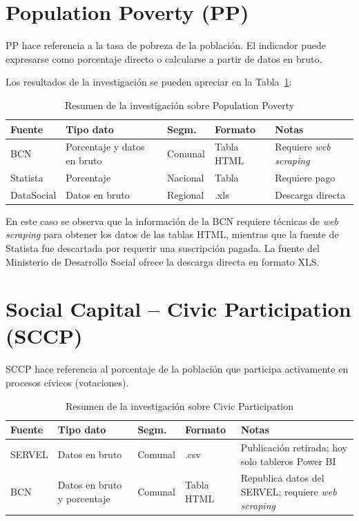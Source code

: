 \documentclass[12pt,letterpaper,oneside]{report}
\begin{document}
\section{Population Poverty (PP)}
\label{sec:pp}

PP hace referencia a la tasa de pobreza de la poblaci\'on. El indicador puede expresarse como porcentaje directo o calcularse a partir de datos en bruto.

Los resultados de la investigaci\'on se pueden apreciar en la Tabla~\ref{tab:pp}:

\begin{table}[H]
\centering
\caption{Resumen de la investigaci\'on sobre Population Poverty}
\label{tab:pp}
\begin{tabular}{|p{3cm}|p{2.5cm}|p{2cm}|p{2cm}|p{3cm}|}
\hline
\textbf{Fuente} & \textbf{Tipo dato} & \textbf{Segm.} & \textbf{Formato} & \textbf{Notas} \\
\hline
BCN \parencite{bcn-a} & Porcentaje y datos en bruto & Comunal & Tabla HTML & Requiere \textit{web scraping} \\
\hline
Statista \parencite{statista} & Porcentaje & Nacional & Tabla & Requiere pago \\
\hline
DataSocial \parencite{datasocial} & Datos en bruto & Regional & .xls & Descarga directa \\
\hline
\end{tabular}
\end{table}

En este caso se observa que la informaci\'on de la BCN requiere t\'ecnicas de \textit{web scraping} para obtener los datos de las tablas HTML, mientras que la fuente de Statista fue descartada por requerir una suscripci\'on pagada. La fuente del Ministerio de Desarrollo Social ofrece la descarga directa en formato XLS.

\section{Social Capital -- Civic Participation (SCCP)}
\label{sec:sccp}

SCCP hace referencia al porcentaje de la poblaci\'on que participa activamente en procesos c\'ivicos (votaciones).

\begin{table}[H]
\centering
\caption{Resumen de la investigaci\'on sobre Civic Participation}
\label{tab:sccp}
\begin{tabular}{|p{3cm}|p{2.5cm}|p{2cm}|p{2cm}|p{3cm}|}
\hline
\textbf{Fuente} & \textbf{Tipo dato} & \textbf{Segm.} & \textbf{Formato} & \textbf{Notas} \\
\hline
SERVEL \parencite{servel} & Datos en bruto & Comunal & .csv & Publicaci\'on retirada; hoy solo tableros Power BI \\
\hline
BCN \parencite{bcn-d} & Datos en bruto y porcentaje & Comunal & Tabla HTML & Republica datos del SERVEL; requiere \textit{web scraping} \\
\hline
\end{tabular}
\end{table}
\end{document}
